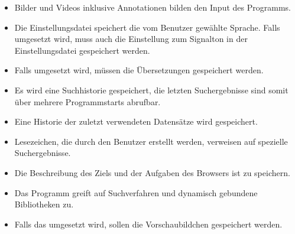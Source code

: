 \begin{itemize}
	\item Bilder und Videos inklusive Annotationen bilden den Input des Programms.
	\item Die Einstellungsdatei speichert die vom Benutzer gewählte Sprache. Falls  umgesetzt wird, muss auch die Einstellung zum Signalton in der Einstellungsdatei gespeichert werden.
	\item Falls  umgesetzt wird, müssen die Übersetzungen gespeichert werden.
	\item Es wird eine Suchhistorie gespeichert, die letzten Suchergebnisse sind somit über mehrere Programmstarts abrufbar. 
	\item Eine Historie der zuletzt verwendeten Datensätze wird gespeichert.
	\item Lesezeichen, die durch den Benutzer erstellt werden, verweisen auf spezielle Suchergebnisse.
	\item Die Beschreibung des Ziels und der Aufgaben des Browsers ist zu speichern.
	\item Das Programm greift auf Suchverfahren und dynamisch gebundene Bibliotheken zu.
	\item Falls das  umgesetzt wird, sollen die Vorschaubildchen gespeichert werden.
\end{itemize}
\pagebreak
